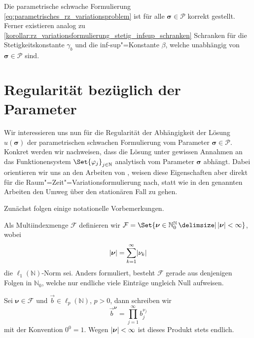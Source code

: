 \documentclass[../main.tex]{subfiles}
\begin{document}
\begin{Korollar}
\label{korollar:parametrisches_rz_variationsproblem_sachgemaess}
    Die parametrische schwache Formulierung \cref{eq:parametrisches_rz_variationsproblem} ist für alle $\bm\sigma \in \mathcal P$ korrekt gestellt.
    Ferner existieren analog zu \cref{korollar:rz_variationsformulierung_stetig_infsup_schranken} Schranken für die Stetigkeitskonstante $\gamma_{b}$ und die inf-sup"=Konstante $\beta$, welche unabhängig von $\bm \sigma \in \mathcal P$ sind.
\end{Korollar}


\section{Regularität bezüglich der Parameter} %
\label{section:regularitaet_bezueglich_der_parameter}

Wir interessieren uns nun für die Regularität der Abhängigkeit der Lösung $u(\bm\sigma)$ der parametrischen schwachen Formulierung vom Parameter $\bm \sigma \in \mathcal P$.
Konkret werden wir nachweisen, dass die Lösung unter gewissen Annahmen an das Funktionensystem $\Set{\varphi_{j}}_{j \in \mathbb{N}}$ analytisch vom Parameter $\bm \sigma$ abhängt.
Dabei orientieren wir uns an den Arbeiten von \textcite{Cohen:2010kz,Cohen:2011jp,Kunoth:2013ef}, weisen diese Eigenschaften aber direkt für die Raum"=Zeit"=Variationsformulierung nach, statt wie in den genannten Arbeiten den Umweg über den stationären Fall zu gehen.

Zunächst folgen einige notationelle Vorbemerkungen.
\begin{Bemerkung}
    Als Multiindexmenge $\mathcal F$ definieren wir $\mathcal F = \Set{ \bm\nu \in \mathbb{N}^{\mathbb{N}}_{0} \given \abs{\bm\nu} < \infty }$, wobei
    \begin{equation}
        \lvert\bm\nu\rvert = \sum_{k = 1}^{\infty} \lvert\nu_{k}\rvert
    \end{equation}
    die $\ell_{1}(\mathbb{N})$-Norm sei.
    Anders formuliert, besteht $\mathcal F$ gerade aus denjenigen Folgen in $\mathbb{N}_{0}$, welche nur endliche viele Einträge ungleich Null aufweisen.

    Sei $\bm\nu \in \mathcal F$ und $\vec{b} \in \ell_{p}(\mathbb{N})$, $p > 0$, dann schreiben wir
    \begin{equation}
        \vec{b}^{\bm\nu} = \prod_{j = 1}^{\infty} b_{j}^{\nu_{j}}
    \end{equation}
    mit der Konvention $0^{0} = 1$.
    Wegen $\lvert\bm\nu\rvert < \infty$ ist dieses Produkt stets endlich.
\end{Bemerkung}
\end{document}
